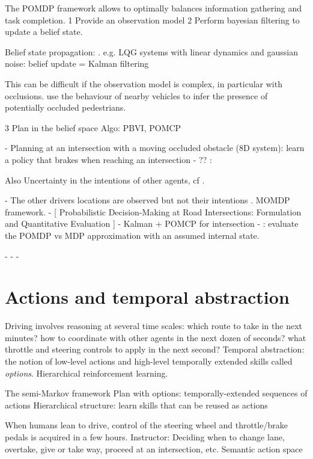 The POMDP framework allows to optimally balances information gathering
and task completion.
1 Provide an observation model
2 Perform bayesian filtering to update a belief state.

Belief state propagation: .
e.g. LQG systems with linear dynamics and gaussian noise: belief update = Kalman filtering \citep{VanDenBerg2011}

This can be difficult if the observation model is complex, in particular with occlusions. \citet{Sun2019} use the behaviour of nearby vehicles to infer the presence of potentially occluded pedestrians.

3 Plan in the belief space
Algo: PBVI, POMCP


\citep{Brechtel2011}
- Planning at an intersection with a moving occluded obstacle (8D system): learn a policy that brakes when reaching an intersection \citep{Brechtel2013}
- ?? : \citep{Brechtel2014}

Also Uncertainty in the intentions of other agents, cf .

- The other drivers locations are observed but not their intentions \citep{Bandyopadhyay2013}. MOMDP framework.
- [ Probabilistic Decision-Making at Road Intersections: Formulation and Quantitative Evaluation ]
- Kalman + POMCP for intersection \citep{Barbier2018}
- \citep{Sunberg2017}: evaluate the POMDP vs MDP approximation with an assumed internal state.

- \citep{Bry2011}
- \citep{Xu2014,Sadigh2016}
- \citep{VanDenBerg2017}


\section{Actions and temporal abstraction}

Driving involves reasoning at several time scales: which route to take in the next minutes? how to coordinate with other agents in the next dozen of seconds? what throttle and steering controls to apply in the next second?
Temporal abstraction: the notion of low-level actions and high-level temporally extended skills called \emph{options}. Hierarchical reinforcement learning.

The semi-Markov framework
Plan with options: temporally-extended sequences of actions
Hierarchical structure: learn skills that can be reused as actions

When humans lean to drive, control of the steering wheel and throttle/brake pedals is acquired in a few hours. 
Instructor: Deciding when to change lane, overtake, give or take way, proceed at an intersection, etc.
Semantic action space

